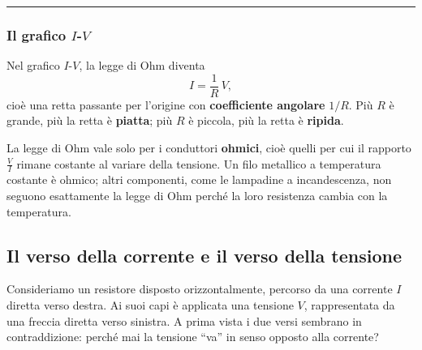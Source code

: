 \hrule
\subsubsection{Il grafico \(I\)-\(V\)}

\noindent
\begin{minipage}[t]{0.52\textwidth}
\vspace{0pt}
Nel grafico \(I\)-\(V\), la legge di Ohm diventa
\[
I = \frac{1}{R}\,V,
\]
cioè una retta passante per l'origine con \textbf{coefficiente angolare} \(1/R\). Più \(R\) è grande, più la retta è \textbf{piatta}; più \(R\) è piccola, più la retta è \textbf{ripida}.
\end{minipage}%
\hfill
\begin{minipage}[t]{0.45\textwidth}
\vspace{0pt}
\centering
{}
\end{minipage}

\begin{attenzione}
La legge di Ohm vale solo per i conduttori \textbf{ohmici}, cioè quelli per cui il rapporto \(\frac{V}{I}\) rimane costante al variare della tensione. Un filo metallico a temperatura costante è ohmico; altri componenti, come le lampadine a incandescenza, non seguono esattamente la legge di Ohm perché la loro resistenza cambia con la temperatura.
\end{attenzione}




\subsection{Il verso della corrente e il verso della tensione}

Consideriamo un resistore disposto orizzontalmente, percorso da una corrente \(I\) diretta verso destra. Ai suoi capi è applicata una tensione \(V\), rappresentata da una freccia diretta verso sinistra. A prima vista i due versi sembrano in contraddizione: perché mai la tensione “va” in senso opposto alla corrente?

